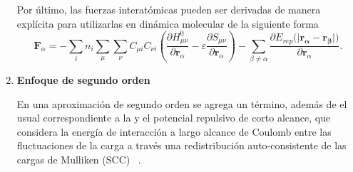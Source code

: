 \begin{enumerate}
        Por último, las fuerzas interatómicas pueden ser derivadas de manera
        explícita para utilizarlas en dinámica molecular de la siguiente forma
        $$
        \mathbf{F}_{\alpha} = - \sum_i n_i \sum_{\mu} \sum_{\nu} C_{\mu i} C_{\nu i} \left(\frac{\partial H_{\mu \nu}^0}{\partial \mathbf{r}_{\alpha}} - \varepsilon \frac{\partial S_{\mu \nu}}{\partial \mathbf{r}_{\alpha}}\right) - \sum_{\beta \neq \alpha} \frac{\partial E_{rep}(|\mathbf{r_{\alpha} - \mathbf{r}_{\beta}|)}}{\partial \mathbf{r}_{\alpha}}.
        $$

    \item \textbf{Enfoque de segundo orden}

        En una aproximación de segundo orden se agrega un término, además de
        el usual correspondiente a la  y el 
        potencial repulsivo de corto alcance, que considera la energía de
        interacción a largo alcance de Coulomb entre las fluctuaciones de la 
        carga a través una redistribución auto-consistente de las cargas de 
        Mulliken (SCC) ~\cite{dftb3}.


\end{enumerate}
